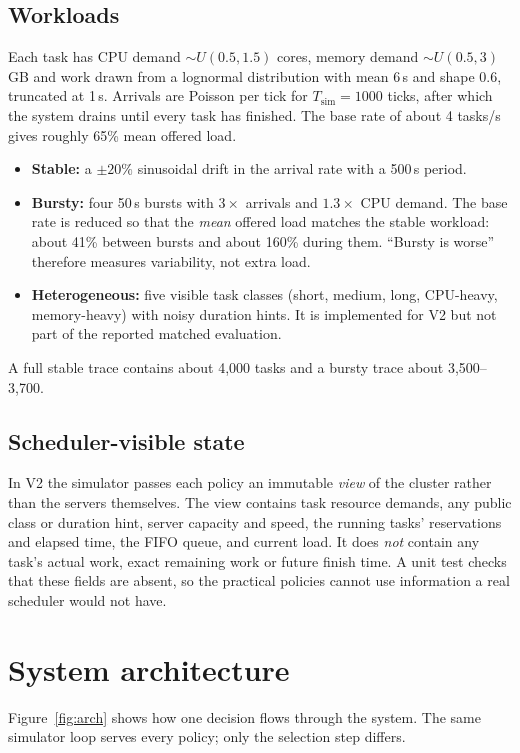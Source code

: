 \documentclass[11pt,a4paper]{article}
\begin{document}
\subsection{Workloads}
Each task has CPU demand $\sim U(0.5,1.5)$ cores, memory demand $\sim U(0.5,3)$\,GB and work drawn from a
lognormal distribution with mean 6\,s and shape 0.6, truncated at 1\,s. Arrivals are Poisson per tick for
$T_{\mathrm{sim}}=1000$ ticks, after which the system drains until every task has finished. The base rate of
about 4 tasks/s gives roughly 65\% mean offered load.
\begin{itemize}
  \item \textbf{Stable:} a $\pm20\%$ sinusoidal drift in the arrival rate with a 500\,s period.
  \item \textbf{Bursty:} four 50\,s bursts with $3\times$ arrivals and $1.3\times$ CPU demand. The base rate is
        reduced so that the \emph{mean} offered load matches the stable workload: about 41\% between bursts and
        about 160\% during them. ``Bursty is worse'' therefore measures variability, not extra load.
  \item \textbf{Heterogeneous:} five visible task classes (short, medium, long, CPU-heavy, memory-heavy) with noisy
        duration hints. It is implemented for V2 but not part of the reported matched evaluation.
\end{itemize}
A full stable trace contains about 4,000 tasks and a bursty trace about 3,500--3,700.

\subsection{Scheduler-visible state}
In V2 the simulator passes each policy an immutable \emph{view} of the cluster rather than the servers
themselves. The view contains task resource demands, any public class or duration hint, server capacity and
speed, the running tasks' reservations and elapsed time, the FIFO queue, and current load. It does
\emph{not} contain any task's actual work, exact remaining work or future finish time. A unit test checks that
these fields are absent, so the practical policies cannot use information a real scheduler would not have.

\section{System architecture}
Figure~\ref{fig:arch} shows how one decision flows through the system. The same simulator loop serves every
policy; only the selection step differs.
\end{document}
